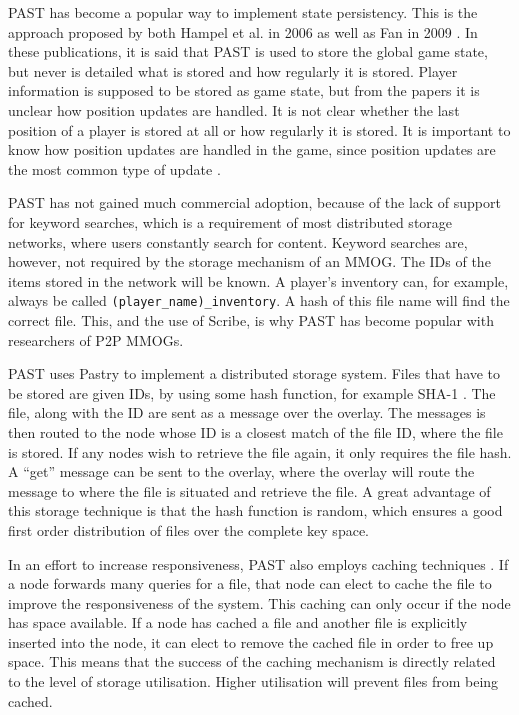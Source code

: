 \documentclass[10pt,a4paper,journal,cspaper,compsoc]{IEEEtran}
\begin{document}
PAST has become a popular way to implement state persistency. This is the approach proposed by both Hampel et al. in 2006 \cite{past_storage_focus}
as well as Fan in 2009 \cite{Fan_phd}. In these publications, it is said that PAST is used to store the global game state, but never is detailed what
is stored and how regularly it is stored. Player information is supposed to be stored as game state, but from the papers it is unclear how position
updates are handled. It is not clear whether the last position of a player is stored at all or how regularly it is stored. It is important to know
how position updates are handled in the game, since position updates are the most common type of update \cite{knutsson_p2p_first}.

PAST has not gained much commercial adoption, because of the lack of support for keyword searches, which is a requirement of most distributed storage
networks, where users constantly search for content. Keyword searches are, however, not required by the storage mechanism of an MMOG. The IDs of the
items stored in the network will be known. A player's inventory can, for example, always be called \verb.(player_name)_inventory.. A hash of this
file name will find the correct file. This, and the use of Scribe, is why PAST has become popular with researchers of P2P MMOGs.

PAST \cite{PAST_storage} uses Pastry to implement a distributed storage system. Files that have to be stored are given IDs, by using some hash
function, for example SHA-1 \cite{SHA}. The file, along with the ID are sent as a message over the overlay. The messages is then routed to the node
whose ID is a closest match of the file ID, where the file is stored. If any nodes wish to retrieve the file again, it only requires the file hash. A
``get'' message can be sent to the overlay, where the overlay will route the message to where the file is situated and retrieve the file. A great
advantage of this storage technique is that the hash function is random, which ensures a good first order distribution of files over the complete key
space.

In an effort to increase responsiveness, PAST also employs caching techniques \cite{storage_and_chaching_PAST}. If a node forwards many queries for a
file, that node can elect to cache the file to improve the responsiveness of the system. This caching can only occur if the node has space available.
If a node has cached a file and another file is explicitly inserted into the node, it can elect to remove the cached file in order to free up space.
This means that the success of the caching mechanism is directly related to the level of storage utilisation. Higher utilisation will prevent files
from being cached.
\end{document}
